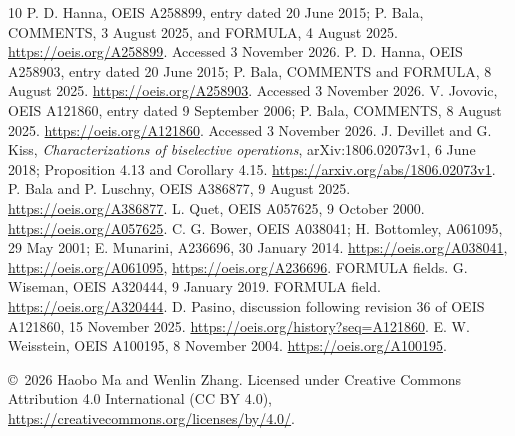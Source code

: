 \documentclass[11pt]{article}
\begin{document}
\begin{thebibliography}{10}
P. D. Hanna, OEIS A258899, entry dated 20 June 2015;
P. Bala, COMMENTS, 3 August 2025, and FORMULA, 4 August 2025.
\url{https://oeis.org/A258899}. Accessed 3 November 2026.
P. D. Hanna, OEIS A258903, entry dated 20 June 2015;
P. Bala, COMMENTS and FORMULA, 8 August 2025.
\url{https://oeis.org/A258903}. Accessed 3 November 2026.
V. Jovovic, OEIS A121860, entry dated 9 September 2006;
P. Bala, COMMENTS, 8 August 2025.
\url{https://oeis.org/A121860}. Accessed 3 November 2026.
J. Devillet and G. Kiss, \emph{Characterizations of biselective operations},
arXiv:1806.02073v1, 6 June 2018; Proposition 4.13 and Corollary 4.15.
\url{https://arxiv.org/abs/1806.02073v1}.
P. Bala and P. Luschny, OEIS A386877, 9 August 2025.
\url{https://oeis.org/A386877}.
L. Quet, OEIS A057625, 9 October 2000.
\url{https://oeis.org/A057625}.
C. G. Bower, OEIS A038041; H. Bottomley, A061095, 29 May 2001;
E. Munarini, A236696, 30 January 2014.
\url{https://oeis.org/A038041}, \url{https://oeis.org/A061095},
\url{https://oeis.org/A236696}. FORMULA fields.
G. Wiseman, OEIS A320444, 9 January 2019. FORMULA field.
\url{https://oeis.org/A320444}.
D. Pasino, discussion following revision 36 of OEIS A121860,
15 November 2025. \url{https://oeis.org/history?seq=A121860}.
E. W. Weisstein, OEIS A100195, 8 November 2004.
\url{https://oeis.org/A100195}.
\end{thebibliography}
\medskip\noindent\small
\copyright\ 2026 Haobo Ma and Wenlin Zhang.
Licensed under Creative Commons Attribution 4.0 International (CC BY 4.0),
\url{https://creativecommons.org/licenses/by/4.0/}.
\end{document}
